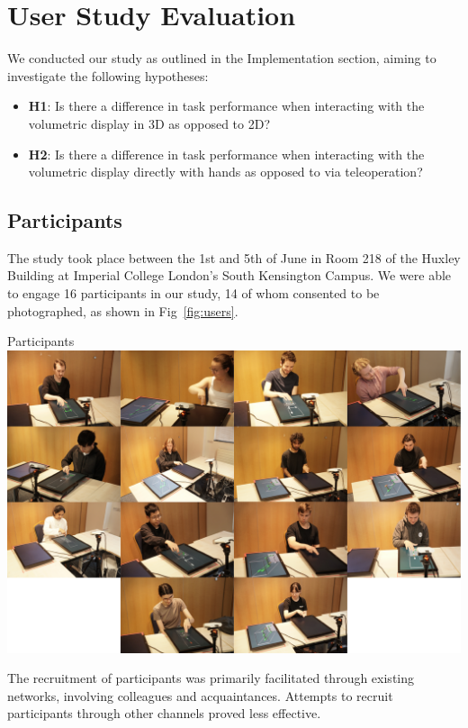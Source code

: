 \section{User Study Evaluation}

We conducted our study as outlined in the Implementation section, aiming to investigate the following hypotheses:

\begin{itemize}
    \item \textbf{H1}: Is there a difference in task performance when interacting with the volumetric display in 3D as opposed to 2D?
    \item \textbf{H2}: Is there a difference in task performance when interacting with the volumetric display directly with hands as opposed to via teleoperation?
\end{itemize}

\subsection{Participants}
The study took place between the 1st and 5th of June in Room 218 of the Huxley Building at Imperial College London's South Kensington Campus. We were able to engage 16 participants in our study, 14 of whom consented to be photographed, as shown in Fig~\ref{fig:users}.

\begin{figureBox}[label={fig:users}, width=1.0\linewidth]{Participants}
    \includegraphics[width = 1.0\linewidth]{./evaluation/figures/users.pdf}
\end{figureBox}

The recruitment of participants was primarily facilitated through existing networks, involving colleagues and acquaintances. Attempts to recruit participants through other channels proved less effective. \\

